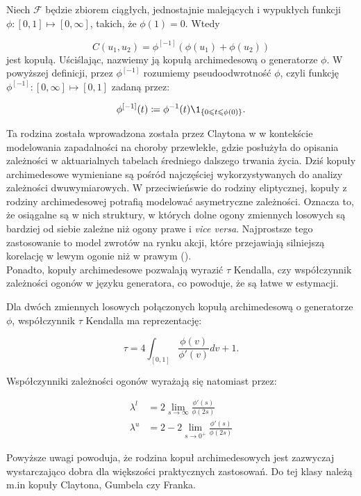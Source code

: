 \begin{df}
		Niech $\mathcal{F}$ będzie zbiorem ciągłych, jednostajnie malejących i wypukłych funkcji $\phi \colon [0,1] \mapsto [0, \infty]$, takich, że $\phi(1) = 0$. Wtedy
		
		$$ C(u_1, u_2) = \phi^{[-1]}(\phi(u_1)+\phi(u_2))$$
		jest kopułą. Uściślając, nazwiemy ją kopułą archimedesową o generatorze $\phi$. W powyższej definicji, przez $\phi^{[-1]}$ rozumiemy pseudoodwrotność $\phi$, czyli funkcję $\phi^{[-1]}\colon [0, \infty] \mapsto [0, 1]$ zadaną przez:
		
		$$ \phi^{[-1]}(t) \coloneqq \phi^{-1}(t) \1_{\{0\leqslant t \leqslant \phi(0)\}}. $$
\end{df}

Ta rodzina została wprowadzona została przez Claytona w \cite{Clayton1972} w kontekście modelowania zapadalności na choroby przewlekłe, gdzie posłużyła do opisania zależności w aktuarialnych tabelach średniego dalszego trwania życia. Dziś kopuły archimedesowe wymieniane są pośród najczęściej wykorzystywanych do analizy zależności dwuwymiarowych. W przeciwieńswie do rodziny eliptycznej, kopuły z rodziny archimedesowej potrafią modelować asymetryczne zależności. Oznacza to, że osiągalne są w nich struktury, w których dolne ogony zmiennych losowych są bardziej od siebie zależne niż ogony prawe i \emph{vice versa}. Najprostsze tego zastosowanie to model zwrotów na rynku akcji, które przejawiają silniejszą korelację w lewym ogonie niż w prawym (\cite{AssymetricEquityDependency}). \\
Ponadto, kopuły archimedesowe pozwalają wyrazić $\tau$ Kendalla, czy współczynnik zależności ogonów w języku generatora, co powoduje, że są łatwe w estymacji.

\begin{prop}
	Dla dwóch zmiennych losowych połączonych kopułą archimedesową o generatorze $\phi$, współczynnik $\tau$ Kendalla ma reprezentację:
	
	$$ \tau = 4\int_{[0, 1]}\frac{\phi(v)}{\phi'(v)}dv + 1.$$
	
	Współczynniki zależności ogonów wyrażają się natomiast przez:
	
	\begin{equation}
		\begin{split}
		\lambda^{l}&=2\lim\limits_{s\to\infty}\frac{\phi'(s)}{\phi(2s)} \\
		\lambda^{u}&=2-2\lim\limits_{s\to0^{+}}\frac{\phi'(s)}{\phi(2s)}
		\end{split}
	\end{equation}
\end{prop}
Powyższe uwagi powoduja, że rodzina kopuł archimedesowych jest zazwyczaj wystarczająco dobra dla większości praktycznych zastosowań. Do tej klasy należą m.in kopuły Claytona, Gumbela czy Franka.

